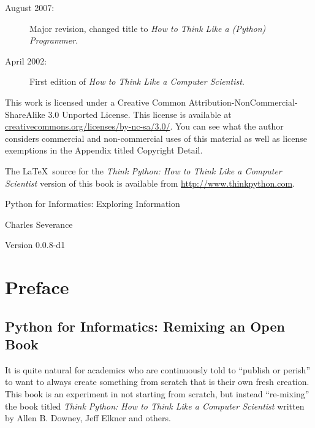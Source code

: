\documentclass[11pt]{book}
\newcommand{\thetitle}{Python for Informatics: Exploring Information}
\newcommand{\theversion}{0.0.8-d1}
\begin{document}
\begin{latexonly}
{\begin{description}
\item[August 2007:] Major revision, changed title to
\emph{How to Think Like a (Python) Programmer}.

\item[April 2002:] First edition of \emph{How to Think Like
a Computer Scientist}.

\end{description}

\vspace{0.2in}

This work is licensed under a 
Creative Common
Attribution-NonCommercial-ShareAlike 3.0 Unported License.
This license is 
available at
\url{creativecommons.org/licenses/by-nc-sa/3.0/}.  You can 
see what the author considers commercial and non-commercial
uses of this material as well as license exemptions 
in the Appendix titled Copyright Detail.

The \LaTeX\ source for the 
\emph{Think Python: How to Think Like
a Computer Scientist}
version of this book is available from
\url{http://www.thinkpython.com}.

\vspace{0.2in}

} %

\end{latexonly}



\begin{htmlonly}


{\Large \thetitle}

{\large 
Charles Severance}

Version \theversion

\setcounter{chapter}{-1}

\end{htmlonly}

\chapter{Preface}

\section*{Python for Informatics: Remixing an Open Book}

It is quite natural for academics who are continuously told to 
``publish or perish'' to want to always create something from scratch
that is their own fresh creation.   This book is an 
experiment in not starting from scratch, but instead ``re-mixing''
the book titled
\emph{Think Python: How to Think Like
a Computer Scientist}
written by Allen B. Downey, Jeff Elkner and others.
\end{document}
